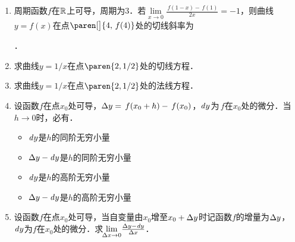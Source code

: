 \documentclass[a4paper,punct=CCT]{ctexbook}
\theoremstyle{definition}
\theoremstyle{remark}
\newif\ifshowsol
\begin{document}
\begin{enumerate}
\item 周期函数\(f\)在\(\mathbb{R}\)上可导，周期为\(3\)．若\(\lim\limits_{x\to0} \frac{\,f(1-x)-\,f(1)}{2x} = -1\)，则曲线\(y = f(x)\)在点\(\paren[\big]{4, \,f(4)}\)处的切线斜率为
  \ifshowsol
  \uline{\makebox[4em]{\(2\)}}．

  实际上，有
  \begin{equation*}
    f'(1)
    = \!\lim_{\fdx\to0} \!\frac{\,f(1+\fdx) - \,f(1)}{\fdx}
    = \lim_{x\to0} \frac{\,f(1-x) - \,f(1)}{-x}
    = -2 \lim_{x\to0} \frac{\,f(1-x)-\,f(1)}{2x}
    = 2.
  \end{equation*}
  从而\(\,f'(4) = \,f'(1) = 2\)．
  \else
  \uline{\hspace{4em}}．
  \fi

\item 求曲线\(y = 1/x\)在点\(\paren{2,1/2}\)处的切线方程．

  \ifshowsol
  因为\(\,f'(2) = -1/4\)，自然有
  \begin{equation*}
    y = \frac12 - \frac14 \paren{x-2}.
  \end{equation*}
  \fi

\item 求曲线\(y = 1/x\)在点\(\paren{2,1/2}\)处的法线方程．

  \ifshowsol
  因为\(\,f'(2) = -1/4\)，自然有
  \begin{equation*}
    y = \frac12 + 4(x-2).
  \end{equation*}
  \fi

\item 设函数\(f\)在点\(x_0\)处可导，\(\mathop{}\!\Delta y = \,f(x_0+h) - \,f(x_0)\)，\(\dy\)为\(\,f\)在\(x_0\)处的微分．当\(h \to 0\)时，必有\uline{\hspace*{6em}}．
  \begin{itemize}
    \renewcommand{\labelitemi}{\faCircleThin}
  \item \(\dy\)是\(h\)的同阶无穷小量
  \item \(\mathop{}\!\Delta y - \mathop{}\!\mathit{d} y\)是\(h\)的同阶无穷小量
  \item \(\dy\)是\(h\)的高阶无穷小量
    \ifshowsol
  \item[\faCircle]
    \else
  \item
    \fi
    \(\mathop{}\!\Delta y - \mathop{}\!\mathit{d} y\)是\(h\)的高阶无穷小量
  \end{itemize}

  \ifshowsol
  若\(\,f'(x_0) \ne 0\)，则\(\dy\)是\(h\)的高阶无穷小量；若\(\,f'(x_0) = 0\)，则\(\dy\)是\(h\)的同阶无穷小量．因此，选项~A和~C都不对．
  \fi

\item 设函数\(f\)在点\(x_0\)处可导，当自变量由\(x_0\)增至\(x_0+\mathop{}\!\Delta y\)时记函数\(f\)的增量为\(\mathop{}\!\Delta y\)，\(\dy\)为\(f\)在\(x_0\)处的微分．求\(\!\lim\limits_{\mathop{}\!\Delta x\to0} \!\frac{\mathop{}\!\Delta y - \mathop{}\!\mathit{d} y}{\mathop{}\!\Delta x}\)．

  \ifshowsol
  显然等于零．
  \fi
\end{enumerate}
\fi
\end{document}
